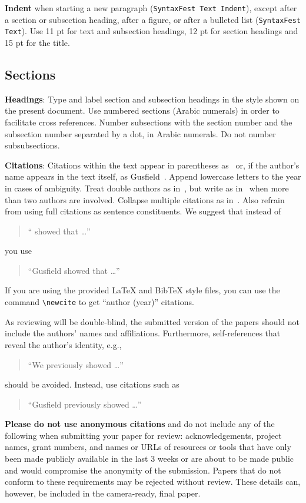 \documentclass[11pt]{article}
\begin{document}
\textbf{Indent} when starting a new paragraph (\texttt{SyntaxFest Text Indent}), except after a section or subsection heading, after a figure, or after a bulleted list (\texttt{SyntaxFest Text}).  Use 11 pt for text and subsection headings, 12 pt for section headings and 15 pt for the title. 


\subsection{Sections}

\textbf{Headings}: Type and label section and subsection headings in the style shown on the present document. Use numbered sections (Arabic numerals) in order to facilitate cross references. Number subsections with the section number and the subsection number separated by a dot, in Arabic numerals. Do not number subsubsections.

\textbf{Citations}: Citations within the text appear in parentheses
as~\cite{Gusfield:97} or, if the author's name appears in the text itself, as Gusfield~. Append lowercase letters to the year in cases of ambiguity. Treat double authors as in~\cite{Aho:72}, but write as in~\cite{Chandra:81} when more than two authors are involved. Collapse multiple citations as in~\cite{Gusfield:97,Aho:72}. Also refrain from using full citations as sentence constituents. We suggest that instead of
\begin{quote}
  ``\cite{Gusfield:97} showed that \ldots''
\end{quote}
you use
\begin{quote}
``Gusfield    showed that \ldots''
\end{quote}

If you are using the provided LaTeX and BibTeX style files, you
can use the command \verb|\newcite| to get ``author (year)'' citations.

As reviewing will be double-blind, the submitted version of the papers should not include the authors' names and affiliations. Furthermore, self-references that reveal the author's identity, e.g.,
\begin{quote}
``We previously showed \cite{Gusfield:97} \ldots''  
\end{quote}
should be avoided. Instead, use citations such as 
\begin{quote}
``Gusfield 
previously showed \ldots''
\end{quote}

\textbf{Please do not use anonymous citations} and do not include any of the following when submitting your paper for review: acknowledgements, project names, grant numbers, and names or URLs of resources or tools that have only been made publicly available in the last 3 weeks or are about to be made public and would compromise the anonymity of the submission.
Papers that do not conform to these requirements may be rejected without review. These details can, however, be included in the camera-ready, final paper.
\end{document}
